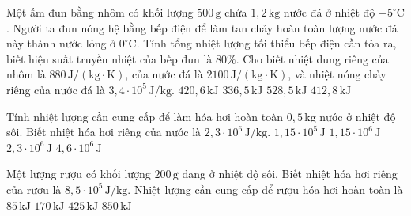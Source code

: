 \begin{ex}
Một ấm đun bằng nhôm có khối lượng $500\,\mathrm{g}$ chứa $1,2\,\mathrm{kg}$ nước đá ở nhiệt độ $-5^{\circ}\mathrm{C}$. Người ta đun nóng hệ bằng bếp điện để làm tan chảy hoàn toàn lượng nước đá này thành nước lỏng ở $0^{\circ}\mathrm{C}$. Tính tổng nhiệt lượng tối thiểu bếp điện cần tỏa ra, biết hiệu suất truyền nhiệt của bếp đun là $80\%$. Cho biết nhiệt dung riêng của nhôm là $880\,\mathrm{J/(kg\cdot K)}$, của nước đá là $2100\,\mathrm{J/(kg\cdot K)}$, và nhiệt nóng chảy riêng của nước đá là $3,4\cdot 10^5\,\mathrm{J/kg}$.
\choice
{$420,6\,\mathrm{kJ}$}
{$336,5\,\mathrm{kJ}$}
{\True $528,5\,\mathrm{kJ}$}
{$412,8\,\mathrm{kJ}$}
\end{ex}

\begin{ex}
Tính nhiệt lượng cần cung cấp để làm hóa hơi hoàn toàn $0,5\,\mathrm{kg}$ nước ở nhiệt độ sôi. Biết nhiệt hóa hơi riêng của nước là $2,3\cdot 10^6\,\mathrm{J/kg}$.
\choice
{$1,15\cdot 10^5\,\mathrm{J}$}
{\True $1,15\cdot 10^6\,\mathrm{J}$}
{$2,3\cdot 10^6\,\mathrm{J}$}
{$4,6\cdot 10^6\,\mathrm{J}$}
\end{ex}

\begin{ex}
Một lượng rượu có khối lượng $200\,\mathrm{g}$ đang ở nhiệt độ sôi. Biết nhiệt hóa hơi riêng của rượu là $8,5\cdot 10^5\,\mathrm{J/kg}$. Nhiệt lượng cần cung cấp để rượu hóa hơi hoàn toàn là
\choice
{$85\,\mathrm{kJ}$}
{\True $170\,\mathrm{kJ}$}
{$425\,\mathrm{kJ}$}
{$850\,\mathrm{kJ}$}
\end{ex}

